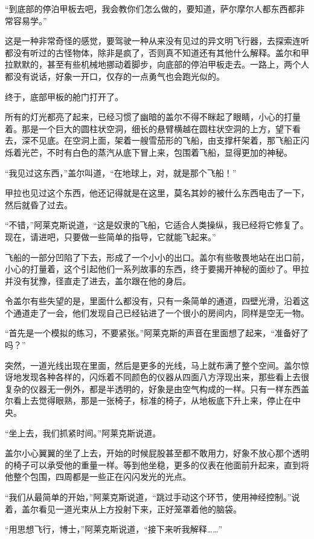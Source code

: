 “到底部的停泊甲板去吧，我会教你们怎么做的，要知道，萨尔摩尔人都东西都非常容易学。” 

这是一种非常奇怪的感觉，要驾驶一种从来没有见过的异文明飞行器，去探索连听都没有听过的古怪物体，除非是疯了，否则真不知道还有其他什么解释。盖尔和甲拉默默的，甚至有些机械地挪动着脚步，向底部的停泊甲板走去。一路上，两个人都没有说话，好象一开口，仅存的一点勇气也会跑光似的。 

终于，底部甲板的舱门打开了。 

所有的灯光都亮了起来，已经习惯了幽暗的盖尔不得不眯起了眼睛，小心的打量着。那是一个巨大的圆柱状空洞，细长的悬臂横越在圆柱状空洞的上方，望下看去，深不见底。在空洞上面，架着一艘雪茄形的飞船，由支撑杆架着，那飞船正闪烁着光芒，不时有白色的蒸汽从底下冒上来，包围着飞船，显得更加的神秘。 

“我见过这东西，”盖尔叫道，“在地球上，对，就是那个飞船！” 

甲拉也见过这个东西，他还记得就是在这里，莫名其妙的被什么东西电击了一下，然后就昏了过去。 

“不错，”阿莱克斯说道，“这是奴隶的飞船，它适合人类操纵，我已经将它修复了。现在，请进吧，只要做一些简单的指导，它就能飞起来。” 

飞船的一部分凹陷了下去，形成了一个小小的出口。盖尔有些敬畏地站在出口前，小心的打量着，这个引起他们一系列故事的东西，终于要揭开神秘的面纱了。甲拉并没有犹豫，径直走了进去，盖尔跟在他的身后。 

令盖尔有些失望的是，里面什么都没有，只有一条简单的通道，四壁光滑，沿着这个通道走了一会，他们发现自己已经钻进了一个很小的房间内，同样是空无一物。 

“首先是一个模拟的练习，不要紧张。”阿莱克斯的声音在里面想了起来，“准备好了吗？” 

突然，一道光线出现在里面，然后是更多的光线，马上就布满了整个空间。盖尔惊讶地发现各种各样的，闪烁着不同颜色的仪器从四面八方浮现出来，那些看上去很复杂的仪器无一例外，都是半透明的，好象是由空气构成的一样。只有一样东西盖尔看上去觉得眼熟，那是一张椅子，标准的椅子，从地板底下升上来，停止在中央。 

“坐上去，我们抓紧时间。”阿莱克斯说道。 

盖尔小心翼翼的坐了上去，开始的时候屁股甚至都不敢用力，好象不放心那个透明的椅子可以承受他的重量一样。等到他坐稳，更多的仪表在他面前升起来，直到将他整个包围，四周都是一些正在闪闪发光的光点。 

“我们从最简单的开始，”阿莱克斯说道，“跳过手动这个环节，使用神经控制。”说着，盖尔看见一道光束从上方投射下来，正好笼罩着他的脑袋。 

“用思想飞行，博士，”阿莱克斯说道，“接下来听我解释……” 

